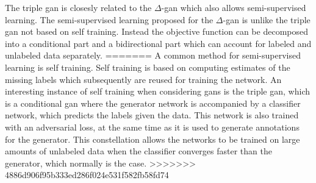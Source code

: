 The triple \acrshort{gan} is closesly related to the $\Delta$-\acrshort{gan} \parencite{triangleNIPS20177109} which also allows semi-supervised learning. The semi-supervised learning proposed for the $\Delta$-\acrshort{gan} is unlike the triple \acrshort{gan} not based on self training. Instead the objective function can be decomposed into a conditional part and a bidirectional part which can account for labeled and unlabeled data separately.
=======
A common method for semi-supervised learning is self training. Self training is based on computing estimates of the missing labels which subsequently are reused for training the network. An interesting instance of self training when considering \acrshort{gans} is the triple \acrshort{gan}, which is a conditional \acrshort{gan} where the generator network is accompanied by a classifier network, which predicts the labels given the data. This network is also trained with an adversarial loss, at the same time as it is used to generate annotations for the generator. This constellation allows the networks to be trained on large amounts of unlabeled data when the classifier converges faster than the generator, which normally is the case.
>>>>>>> 4886d906f95b333ed286f024e531f582fb58fd74










